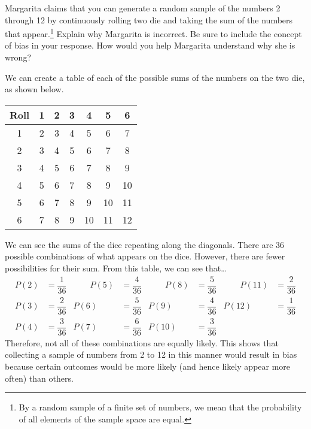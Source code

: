 \documentclass[11pt,letterpaper]{article}
\begin{document}
\newpage



 Margarita claims that you can generate a random sample of the numbers 2 through 12 by continuously rolling two die and taking the sum of the numbers that appear.\footnote{By a random sample of a finite set of numbers, we mean that the probability of all elements of the sample space are equal.} Explain why Margarita is incorrect. Be sure to include the concept of bias in your response. How would you help Margarita understand why she is wrong? \pspace

\sol We can create a table of each of the possible sums of the numbers on the two die, as shown below. \par
	\begin{table}[!ht]
	\centering
	\begin{tabular}{c|cccccc}
	Roll & 1 & 2 & 3 & 4 & 5 & 6 \\ \hline
	1 & 2 & 3 & 4 & 5 & 6 & 7 \\ 
	2 & 3 & 4 & 5 & 6 & 7 & 8 \\
	3 & 4 & 5 & 6 & 7 & 8 & 9 \\
	4 & 5 & 6 & 7 & 8 & 9 & 10 \\
	5 & 6 & 7 & 8 & 9 & 10 & 11 \\
	6 & 7 & 8 & 9 & 10 & 11 & 12
	\end{tabular}
	\end{table} \par
We can see the sums of the dice repeating along the diagonals. There are 36 possible combinations of what appears on the dice. However, there are fewer possibilities for their sum. From this table, we can see that\dots
	\[
	\begin{aligned}
	P(2)&= \dfrac{1}{36} &\qquad P(5)&= \dfrac{4}{36} &\qquad P(8)&= \dfrac{5}{36} &\qquad P(11)&= \dfrac{2}{36} \\[0.3cm]
	P(3)&= \dfrac{2}{36} & P(6)&= \dfrac{5}{36} & P(9)&= \dfrac{4}{36} & P(12)&= \dfrac{1}{36} \\[0.3cm]
	P(4)&= \dfrac{3}{36} & P(7)&= \dfrac{6}{36} & P(10)&= \dfrac{3}{36}
	\end{aligned}
	\]
Therefore, not all of these combinations are equally likely. This shows that collecting a sample of numbers from 2 to 12 in this manner would result in bias because certain outcomes would be more likely (and hence likely appear more often) than others. 
\end{document}
